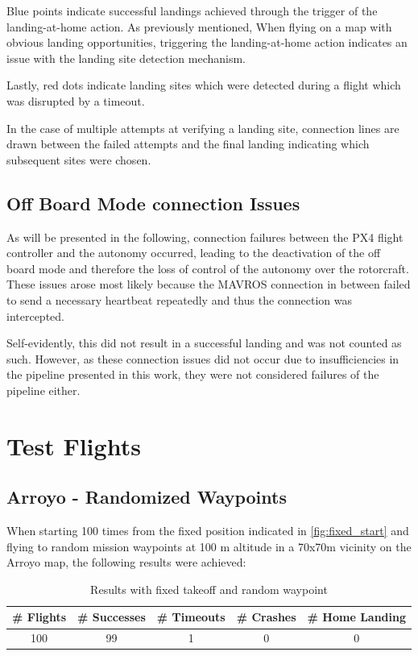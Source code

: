Blue points indicate successful landings achieved through the trigger of the landing-at-home action. As previously mentioned, When flying on a map with obvious landing opportunities, triggering the landing-at-home action indicates an issue with the landing site detection mechanism.

Lastly, red dots indicate landing sites which were detected during a flight which was disrupted by a timeout.

In the case of multiple attempts at verifying a landing site, connection lines are drawn between the failed attempts and the final landing indicating which subsequent sites were chosen.


\subsection{Off Board Mode connection Issues}
As will be presented in the following, connection failures between the PX4 flight controller and the autonomy occurred, leading to the deactivation of the off board mode and therefore the loss of control of the autonomy over the rotorcraft. These issues arose most likely because the MAVROS connection in between failed to send a necessary heartbeat repeatedly and thus the connection was intercepted.

Self-evidently, this did not result in a successful landing and was not counted as such. However, as these connection issues did not occur due to insufficiencies in the pipeline presented in this work, they were not considered failures of the pipeline either.
\clearpage
\section{Test Flights}\label{sec:test_flights}
\subsection{Arroyo - Randomized Waypoints}\label{subsec:eval_rand_wp}

When starting 100 times from the fixed position indicated in \cref{fig:fixed_start} and flying to random mission waypoints at 100 m altitude in a 70x70m vicinity on the Arroyo map, the following results were achieved:

\begin{table}[h]
    \begin{center}
     \caption{Results with fixed takeoff and random waypoint}\vspace{1ex}
     \label{tab:result_random_waypoint}
     \begin{tabular}{|c|c|c|c|c|}
     \hline
     \# Flights & \# Successes & \# Timeouts & \# Crashes & \# Home Landing\\ \hline \hline
     100 & 99 & 1 & 0 & 0 \\
     \hline
     \end{tabular}
    \end{center}
    \end{table}

